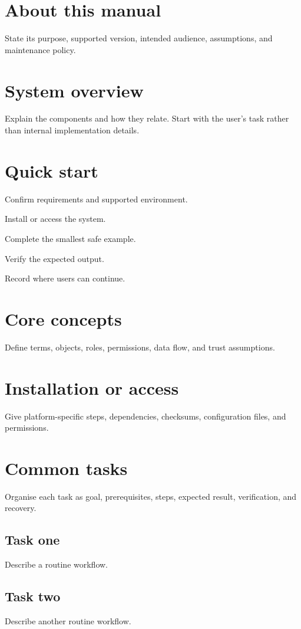 \documentclass[11pt,a4paper]{article}
\begin{document}
\MakeGenesisTitle
\tableofcontents
\clearpage
\section{About this manual}
State its purpose, supported version, intended audience, assumptions, and maintenance policy.
\section{System overview}
Explain the components and how they relate. Start with the user's task rather than internal
implementation details.
\section{Quick start}
\begin{GenesisProcedure}
\begin{genesissteps}
\item Confirm requirements and supported environment.
\item Install or access the system.
\item Complete the smallest safe example.
\item Verify the expected output.
\item Record where users can continue.
\end{genesissteps}
\end{GenesisProcedure}
\section{Core concepts}
Define terms, objects, roles, permissions, data flow, and trust assumptions.
\section{Installation or access}
Give platform-specific steps, dependencies, checksums, configuration files, and permissions.
\section{Common tasks}
Organise each task as goal, prerequisites, steps, expected result, verification, and recovery.
\subsection{Task one}
Describe a routine workflow.
\subsection{Task two}
Describe another routine workflow.
\end{document}
